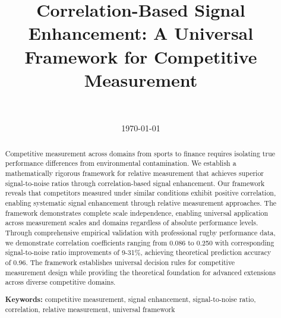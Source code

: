 \documentclass[11pt,a4paper]{article}
\title{Correlation-Based Signal Enhancement: A Universal Framework for Competitive Measurement}
\author{
    \authorone \\
    \textit{\affiliationone}
}
\date{\today}
\begin{document}
\maketitle

\begin{abstract}
Competitive measurement across domains from sports to finance requires isolating true performance differences from environmental contamination. We establish a mathematically rigorous framework for relative measurement that achieves superior signal-to-noise ratios through correlation-based signal enhancement. Our framework reveals that competitors measured under similar conditions exhibit positive correlation, enabling systematic signal enhancement through relative measurement approaches. The framework demonstrates complete scale independence, enabling universal application across measurement scales and domains regardless of absolute performance levels. Through comprehensive empirical validation with professional rugby performance data, we demonstrate correlation coefficients ranging from 0.086 to 0.250 with corresponding signal-to-noise ratio improvements of 9-31\%, achieving theoretical prediction accuracy of 0.96. The framework establishes universal decision rules for competitive measurement design while providing the theoretical foundation for advanced extensions across diverse competitive domains.

\textbf{Keywords:} competitive measurement, signal enhancement, signal-to-noise ratio, correlation, relative measurement, universal framework
\end{abstract}












\end{document}
